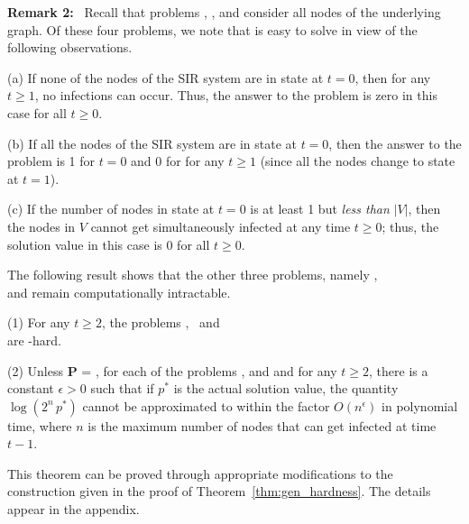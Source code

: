 \medskip

\noindent
\textbf{Remark 2:}~ Recall that problems \tNewInfv, \tTotInfv,
\tVulv{} and \tTotVulv{} consider all nodes of the
underlying graph.
Of these four problems, we note that \tVulv{} is easy to
solve in view of the following observations.

\begin{description}
\item{(a)}
If none of the nodes of the SIR system are in state \istate{} at $t = 0$, 
then for any $t \geq 1$, no infections can occur.
Thus, the answer to the \tVulv{} problem is zero in this case
for all $t \geq 0$.

\item{(b)} If all the nodes of the SIR system are in state \istate{} at $t = 0$, 
then the answer to the problem is 1 for $t = 0$ and 
0 for for any $t \geq 1$ (since all the nodes change to 
state \rstate{} at $t = 1$).

\item{(c)}
If the number of nodes in state \istate{} at $t = 0$ is at least 1 but
\emph{less than} $|V|$, then the nodes in $V$ cannot
get simultaneously infected at any time $t \geq 0$; thus, the solution
value in this case is 0 for all $t \geq 0$.
\end{description}
The following result shows that the other three problems, namely
\tNewInfv,\\ \tTotInfv{} and \tTotVulv{} remain 
computationally intractable.

\begin{theorem} \label{thm:hardness_for_whole_set} \leavevmode
\begin{description}
\item{(1)}
For any $t \geq 2$, the problems \tNewInfv, \tTotInfv{} ~and \\
\tTotVulv{} are \cnump-hard. 
\item{(2)}
Unless \textbf{P} = \cnp,
for each of the problems \tNewInfv, \tTotInfv{} and
\tTotVulv{} and for any $t \geq 2$,
there is a constant $\epsilon > 0$
such that if $p^*$ is the actual solution value,
the quantity $\log{(2^n\,p^*)}$ cannot be approximated to within the factor
$O(n^{\epsilon})$ in polynomial time, where $n$
is the maximum number of nodes that can get infected at time $t-1$.
\end{description}
\end{theorem}

This theorem can be proved through appropriate modifications to
the construction given in the proof of 
Theorem~\ref{thm:gen_hardness}.
The details appear in the appendix.
